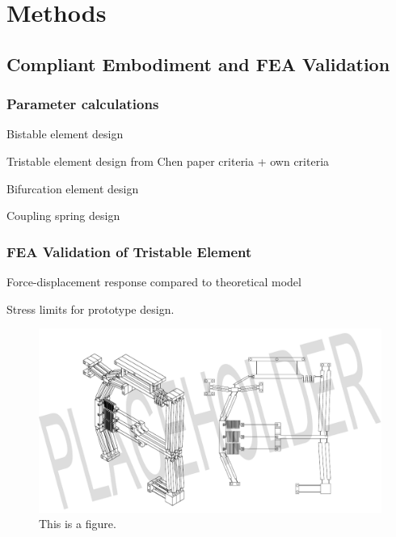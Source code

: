 \section{Methods}
\subsection*{Compliant Embodiment and FEA Validation}
\label{sec:Compliant Embodiment and FEA Validation}



\subsubsection*{Parameter calculations}
Bistable element design

Tristable element design from Chen paper criteria + own criteria

Bifurcation element design

Coupling spring design

\subsubsection*{FEA Validation of Tristable Element}

Force-displacement response compared to theoretical model

Stress limits for prototype design. 

\begin{figure}
    \centering
    \includegraphics[width=\textwidth]{images/SVGs/v5Assembly.pdf}
    \caption{This is a figure.}
    \label{fig:Prototype}
\end{figure}
